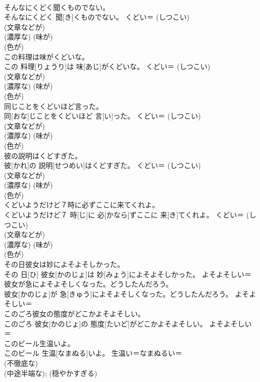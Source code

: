 \documentclass[8pt]{extreport}
\begin{document}
\begin{CJK}{UTF8}{min}
{\\	そんなにくどく聞くものでない。	
\\	そんなにくどく 聞[き]くものでない。	くどい＝ (しつこい) 
\\	(文章などが) 
\\	(濃厚な) (味が) 
\\	(色が) 
\\	この料理は味がくどいな。	
\\	この 料理[りょうり]は 味[あじ]がくどいな。	くどい＝ (しつこい) 
\\	(文章などが) 
\\	(濃厚な) (味が) 
\\	(色が) 
\\	同じことをくどいほど言った。	
\\	同[おな]じことをくどいほど 言[い]った。	くどい＝ (しつこい) 
\\	(文章などが) 
\\	(濃厚な) (味が) 
\\	(色が) 
\\	彼の説明はくどすぎた。	
\\	彼[かれ]の 説明[せつめい]はくどすぎた。	くどい＝ (しつこい) 
\\	(文章などが) 
\\	(濃厚な) (味が) 
\\	(色が) 
\\	くどいようだけど７時に必ずここに来てくれよ。	
\\	くどいようだけど７ 時[じ]に 必[かなら]ずここに 来[き]てくれよ。	くどい＝ (しつこい) 
\\	(文章などが) 
\\	(濃厚な) (味が) 
\\	(色が) 
\\	その日彼女は妙によそよそしかった。	
\\	その 日[ひ] 彼女[かのじょ]は 妙[みょう]によそよそしかった。	よそよそしい＝ 
\\	彼女が急によそよそしくなった。どうしたんだろう。	
\\	彼女[かのじょ]が 急[きゅう]によそよそしくなった。どうしたんだろう。	よそよそしい＝ 
\\	このごろ彼女の態度がどこかよそよそしい。	
\\	このごろ 彼女[かのじょ]の 態度[たいど]がどこかよそよそしい。	よそよそしい＝ 
\\	このビール生温いよ。	
\\	このビール 生温[なまぬる]いよ。	生温い＝なまぬるい＝ 
\\	(不徹底な) 
\\	(中途半端な); (穏やかすぎる)
}
\end{CJK}
\end{document}
